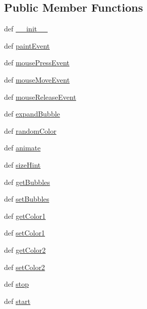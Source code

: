 \subsection*{Public Member Functions}
\begin{DoxyCompactItemize}
\item 
def \hyperlink{classbubbleswidget_1_1BubblesWidget_a30698ab89f65b55c94d37950230f77cc}{\+\_\+\+\_\+init\+\_\+\+\_\+}
\item 
def \hyperlink{classbubbleswidget_1_1BubblesWidget_abc73c679436d8c66cf59fb424827bb4b}{paint\+Event}
\item 
def \hyperlink{classbubbleswidget_1_1BubblesWidget_ae4d4a65080c4172b2a83f223e35fcc35}{mouse\+Press\+Event}
\item 
def \hyperlink{classbubbleswidget_1_1BubblesWidget_afc5d22efb3f3e4a83773004ef7d780bd}{mouse\+Move\+Event}
\item 
def \hyperlink{classbubbleswidget_1_1BubblesWidget_a6b7299a2529f4a4affaa282490fcd16e}{mouse\+Release\+Event}
\item 
def \hyperlink{classbubbleswidget_1_1BubblesWidget_a05f9d1ea9c08a149ce3f92fb7fc900f8}{expand\+Bubble}
\item 
def \hyperlink{classbubbleswidget_1_1BubblesWidget_ab3a71014a6a73dfc6f03a8304dad2776}{random\+Color}
\item 
def \hyperlink{classbubbleswidget_1_1BubblesWidget_af936d2cea6a2f694d81f5177c9d4d563}{animate}
\item 
def \hyperlink{classbubbleswidget_1_1BubblesWidget_a289021b494ba0bbe7464589c9779858a}{size\+Hint}
\item 
def \hyperlink{classbubbleswidget_1_1BubblesWidget_a68ceb69ffde51f2e1c0adc6906de81ef}{get\+Bubbles}
\item 
def \hyperlink{classbubbleswidget_1_1BubblesWidget_a40c57d46e2184af9490f2785f46867f6}{set\+Bubbles}
\item 
def \hyperlink{classbubbleswidget_1_1BubblesWidget_a98ef89f436d46c684641a610a6d808ca}{get\+Color1}
\item 
def \hyperlink{classbubbleswidget_1_1BubblesWidget_ad0af0ef49ad102f012aed60a8bbe248e}{set\+Color1}
\item 
def \hyperlink{classbubbleswidget_1_1BubblesWidget_a30f52038baa9e258b1abd44ae32bb3f2}{get\+Color2}
\item 
def \hyperlink{classbubbleswidget_1_1BubblesWidget_a1064534ca67076a7fe70c34ef7033ded}{set\+Color2}
\item 
def \hyperlink{classbubbleswidget_1_1BubblesWidget_ac22a9864a3bf4dcf34c9ecf73ace2726}{stop}
\item 
def \hyperlink{classbubbleswidget_1_1BubblesWidget_aeeab2f996c09b85c5dee49c34f0c621c}{start}
\end{DoxyCompactItemize}
